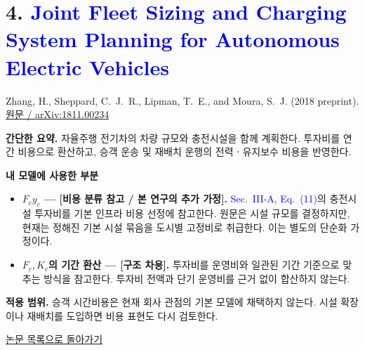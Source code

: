 \documentclass[10pt,a4paper]{article}
\newcommand{\zhangtitle}{Joint Fleet Sizing and Charging System Planning for Autonomous Electric Vehicles}
\newcommand{\backtolist}{\par\smallskip\hyperlink{paper:list}{논문 목록으로 돌아가기}\par}
\begin{document}
\hypertarget{paper:zhang}{}
\section*{4. \textcolor{blue}{\zhangtitle}}
{\color{blue}Zhang, H., Sheppard, C.~J.~R., Lipman, T.~E., and Moura, S.~J. (2018 preprint).}\quad \href{https://arxiv.org/abs/1811.00234}{원문 / arXiv:1811.00234}

\textbf{간단한 요약.} 자율주행 전기차의 차량 규모와 충전시설을 함께 계획한다. 투자비를 연간 비용으로 환산하고, 승객 운송 및 재배치 운행의 전력ㆍ유지보수 비용을 반영한다.

\textbf{내 모델에 사용한 부분}
\begin{itemize}
\item \textbf{$F_cy_c$ --- [비용 분류 참고 / 본 연구의 추가 가정].} \textcolor{blue}{Sec.~III-A, Eq.~(11)}의 충전시설 투자비를 기본 인프라 비용 선정에 참고한다. 원문은 시설 규모를 결정하지만, 현재는 정해진 기본 시설 묶음을 도시별 고정비로 취급한다. 이는 별도의 단순화 가정이다.
\item \textbf{$F_c,K_c$의 기간 환산 --- [구조 차용].} 투자비를 운영비와 일관된 기간 기준으로 맞추는 방식을 참고한다. 투자비 전액과 단기 운영비를 근거 없이 합산하지 않는다.
\end{itemize}
\textbf{적용 범위.} 승객 시간비용은 현재 회사 관점의 기본 모델에 채택하지 않는다. 시설 확장이나 재배치를 도입하면 비용 표현도 다시 검토한다.
\backtolist

\newpage
\hypertarget{assumption:idle}{}
\end{document}

